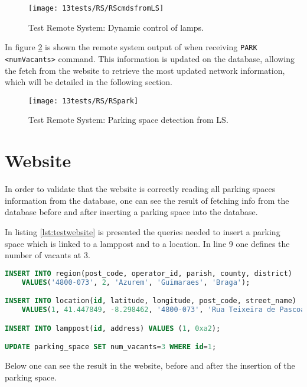 \begin{figure}[H]
	\centering	
	\texttt{[image: 13tests/RS/RScmdsfromLS]}
	\caption{Test Remote System: Dynamic control of lamps.}
	\label{fig:RScmdsfromLS}
\end{figure}

In figure \ref{fig:RSpark} is shown the remote system output of when receiving \linebreak \verb|PARK <numVacants>| command. This information is updated on the database, allowing the fetch from the website to retrieve the most updated network information, which will be detailed in the following section.

\begin{figure}[H]
	\centering	
	\texttt{[image: 13tests/RS/RSpark]}
	\caption{Test Remote System: Parking space detection from LS.}
	\label{fig:RSpark}
\end{figure}

\section{Website}
In order to validate that the website is correctly reading all parking spaces information from the database, one can see the result of fetching info from the database before and after inserting a parking space into the database.

In listing \ref{lst:testwebsite} is presented the queries needed to insert a parking space which is linked to a lamppost and to a location. In line 9 one defines the number of vacants at 3.

\begin{lstlisting}[language=SQL, caption={Test Website: add parking space to the database.}, label={lst:testwebsite}]
INSERT INTO region(post_code, operator_id, parish, county, district) 
	VALUES('4800-073', 2, 'Azurem', 'Guimaraes', 'Braga');

INSERT INTO location(id, latitude, longitude, post_code, street_name) 
	VALUES(1, 41.447849, -8.298462, '4800-073', 'Rua Teixeira de Pascoais');

INSERT INTO lamppost(id, address) VALUES (1, 0xa2);

UPDATE parking_space SET num_vacants=3 WHERE id=1;
\end{lstlisting}

Below one can see the result in the website, before and after the insertion of the parking space.

